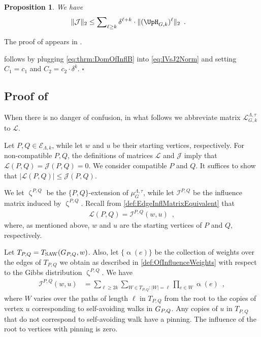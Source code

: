 \documentclass[11pt,reqno]{amsart}
\numberwithin{equation}{section}
\newtheorem{proposition}[theorem]{Proposition}
\newcommand{\cE}{{\mathcal{E}}}
\newcommand{\cI}{{\mathcal{I}}}
\newcommand{\cL}{{\mathcal{L}}}
\newcommand{\applegreen}[1]{ {\color{applegreen}#1}}
\newcommand{\amethyst}[1]{{\color{amethyst}#1} }
\newcommand{\blue}[1]{{\color{blue}#1}}
\newcommand{\bluepigment}[1]{{\color{blue(pigment)}#1}}
\newcommand{\cadmiumgreen}[1]{{\color{cadmiumgreen}#1}}
\newcommand{\goldenbrown}[1]{{\color{goldenbrown}#1}}
\newcommand{\iris}[1]{{\color{iris}#1}}
\newcommand{\red}[1]{{\color{red}#1}}
\newcommand{\rosegold}[1]{{\color{rosegold}#1}}
\newcommand{\ExtV}{\iris{\cE}}
\newcommand{\Tsaw}{T_{\rm SAW}}
\newcommand{\infmatrix}{\cI}
\newcommand{\norm}[2]{\goldenbrown{\|} #1 \goldenbrown{\|}_{#2}}
\newcommand{\abs}[1]{\blue{|}#1\blue{|}}
\newcommand{\NBMatrix}{\cadmiumgreen{\UpH}_{G,\kk}}
\renewcommand{\applegreen}[1]{#1}
\renewcommand{\amethyst}[1]{#1}
\renewcommand{\blue}[1]{#1}
\renewcommand{\bluepigment}[1]{#1}
\renewcommand{\cadmiumgreen}[1]{#1}
\renewcommand{\goldenbrown}[1]{#1}
\renewcommand{\iris}[1]{#1}
\renewcommand{\red}[1]{#1}
\renewcommand{\rosegold}[1]{#1}
\newcommand{\ke}{\blue{e}}
\newcommand{\kk}{\bluepigment{k}}
\newcommand{\kell}{{\color{green(pigment)}\ell}}%
\newcommand{\kP}{\goldenbrown{P}}
\newcommand{\kQ}{\amethyst{Q}}
\newcommand{\ku}{\red{u}}
\newcommand{\kW}{\blue{W}}
\newcommand{\kw}{\blue{w}}
\renewcommand{\ke}{e}
\renewcommand{\kk}{k}
\renewcommand{\kell}{\ell}
\renewcommand{\kP}{P}
\renewcommand{\kQ}{Q}
\renewcommand{\ku}{u}
\renewcommand{\kW}{W}
\renewcommand{\kw}{w}
\newcommand{\infmatrixB}{\mathcal{J}}
\newcommand{\ExtdInfMatrix}{\rosegold{\cL}}
\newcommand{\ExtdInfMatrixF}{\applegreen{\cL}^{\Lambda,\tau}_{G,\kk}}
\newcommand{\infweight}{\upalpha}
\begin{document}
\begin{proposition}\label{prop:CJVskNBM} %
We have 
\begin{align}\label{eq:thrm:DomOfInflB}
\norm{ \infmatrixB}{2}  &\leq 
\sum \nolimits_{\kell\geq \kk} \delta^{\kell+\kk} \cdot \norm{ ( \NBMatrix )^{\kell}}{2}  \enspace.
\end{align}
\end{proposition}

The proof of  appears in .

 follows by plugging \eqref{eq:thrm:DomOfInflB} into
 \eqref{eq:IVsJ2Norm} and setting $C_1=c_1$ and $C_2=c_2\cdot \delta^{\kk}$. 
\hfill $\square$

 
\subsection{Proof of }\label{sec:lemma:eq:CLVsCJEntrywise}
 
 When there is no danger of confusion, in what follows we abbreviate matrix $\ExtdInfMatrixF$ to $\ExtdInfMatrix$. 
 
 Let $\kP,\kQ \in \ExtV_{\Lambda, \kk}$, while let $\kw$ and $\ku$ be their starting vertices, respectively.
%
 For non-compatible $\kP, \kQ$, the definitions of matrices $\ExtdInfMatrix$ and
% 
$ \infmatrixB$ imply that $\ExtdInfMatrix(\kP,\kQ)= \infmatrixB(\kP,\kQ)=0$. 
%
We consider compatible $\kP$ and $\kQ$. It suffices to show that $\abs{\ExtdInfMatrix(\kP,\kQ)} \leq \infmatrixB(\kP,\kQ)$.


We let $\upzeta^{\kP,\kQ}$ be the $\{\kP,\kQ\}$-extension of $\mu^{\Lambda,\tau}_G$,  while let $\infmatrix^{\kP,\kQ}$ be 
the influence matrix induced by $\upzeta^{\kP,\kQ}$.
Recall from \eqref{def:EdgeInflMatrixEquivalent} that 
\begin{align}\label{eq:IPQVsCalLPQ11-3}
\ExtdInfMatrix(\kP, \kQ)=\infmatrix^{\kP,\kQ}(\kw,\ku)\enspace,
\end{align}
where, as mentioned above,   $\kw$ and $\ku$ are the starting vertices of $\kP$ and $\kQ$,  respectively.

%
Let $T_{\kP,\kQ}=\Tsaw(\gext{G}{\kP,\kQ}, \kw)$. 
%
Also, let $\{\infweight(\ke)\}$ be the collection of weights over the edges of $T_{\kP,\kQ}$ we obtain as 
described in \eqref{def:OfInfluenceWeights} with respect to the Gibbs distribution $\upzeta^{\kP,\kQ}$. 
We have 
\begin{align}\label{eq:IPQVsEdgeWeights11-3}
\infmatrix^{\kP,\kQ}(\kw,\ku)&=\sum\nolimits_{\kell \geq 2\kk}\sum\nolimits_{\kW\in T_{\kP,\kQ} : \abs{\kW}=\kell} \prod\nolimits_{\ke\in \kW} \infweight(\ke)\enspace, 
\end{align}
where $\kW$ varies over the paths of length $\kell$ in $T_{\kP,\kQ}$ from the root to the copies of vertex $\ku$
corresponding to self-avoiding walks in $\gext{G}{\kP,\kQ}$. Any copies of $\ku$ in $T_{\kP,\kQ}$ that do not correspond
to self-avoiding walk have a pinning. The influence of the root to  vertices with pinning is zero. 
\end{document}
